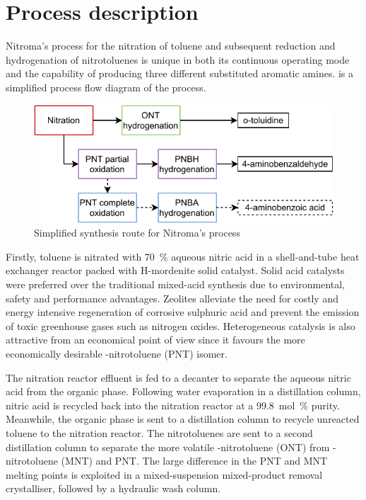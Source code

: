 \section*{Process description}


Nitroma's process for the nitration of toluene and subsequent reduction and hydrogenation of nitrotoluenes is unique in both its continuous operating mode and the capability of producing three different substituted aromatic amines.   is a simplified process flow diagram of the process.
\begin{figure}
    \centering
    \includegraphics[width=0.8\linewidth]{chapters/0-executive-summary/figures/BFD_nitroma-simplifed.pdf}
    \caption{Simplified synthesis route for Nitroma's process}
    \label{fig:BFD-ES}
\end{figure}

Firstly, toluene is nitrated with \SI{70}{\percent} aqueous nitric acid in a shell-and-tube heat exchanger reactor packed with H-mordenite solid catalyst. Solid acid catalysts were preferred over the traditional mixed-acid synthesis due to environmental, safety and performance advantages. Zeolites alleviate the need for costly and energy intensive regeneration of corrosive sulphuric acid and prevent the emission of toxic greenhouse gases such as nitrogen oxides. Heterogeneous catalysis is also attractive from an economical point of view since it favours the more economically desirable \para-nitrotoluene (PNT) isomer. 

The nitration reactor effluent is fed to a decanter to separate the aqueous nitric acid from the organic phase. Following water evaporation in a distillation column, nitric acid is recycled back into the nitration reactor at a \SI{99.8}{mol\percent} purity. Meanwhile, the organic phase is sent to a distillation column to recycle unreacted toluene to the nitration reactor. The nitrotoluenes are sent to a second distillation column to separate the more volatile \ortho-nitrotoluene (ONT) from \meta-nitrotoluene (MNT) and PNT. The large difference in the PNT and MNT melting points is exploited in a mixed-suspension mixed-product removal crystalliser, followed by a hydraulic wash column.

